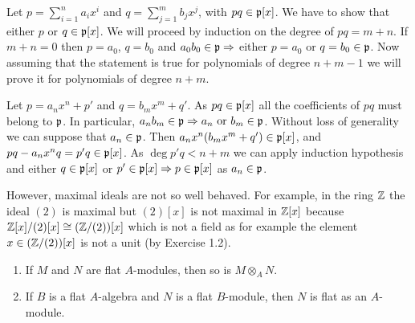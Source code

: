 \begin{sol}
	Let $p = \sum_{i = 1}^n a_i x^i$ and $q = \sum_{j = 1}^m b_j x^j$, with $pq \in \mathfrak{p}[x]$. We have to show that either $p$ or $q \in \mathfrak{p}[x]$. We will proceed by induction on the degree of $pq = m+n$. If $m+n = 0$ then $p = a_0$, $q = b_0$ and $a_0 b_0 \in \mathfrak{p} \Rightarrow$ either $p = a_0$ or $q = b_0 \in \mathfrak{p}$. Now assuming that the statement is true for polynomials of degree $n+m-1$ we will prove it for polynomials of degree $n+m$.

	Let $p = a_nx^n + p'$ and $q = b_m x^m + q'$. As $pq \in \mathfrak{p}[x]$ all the coefficients of $pq$ must belong to $\mathfrak{p}$. In particular, $a_n b_m \in \mathfrak{p} \Rightarrow a_n \text{ or } b_m \in \mathfrak{p}$. Without loss of generality we can suppose that $a_n \in \mathfrak{p}$. Then $a_n x^n (b_m x^m + q') \in \mathfrak{p}[x]$, and $pq - a_n x^n q = p'q \in \mathfrak{p}[x]$. As $\deg{p'q} < n+m$ we can apply induction hypothesis and either $q \in \mathfrak{p}[x]$ or $p' \in \mathfrak{p}[x] \Rightarrow p \in \mathfrak{p}[x]$ as $a_n \in \mathfrak{p}$.

	However, maximal ideals are not so well behaved. For example, in the ring $\mathbb{Z}$ the ideal $(2)$ is maximal but $(2)[x]$ is not maximal in $\mathbb{Z} [x]$ because $\mathbb{Z}[x] / (2)[x] \cong (\mathbb{Z}/(2)) [x]$ which is not a field as for example the element $x \in (\mathbb{Z}/(2)) [x]$ is not a unit (by Exercise 1.2).
\end{sol}

\begin{ex}
	\begin{enumerate}[label=(\roman*)]
		\item If $M$ and $N$ are flat $A$-modules, then so is $M \otimes_A N$.
		\item If $B$ is a flat $A$-algebra and $N$ is a flat $B$-module, then $N$ is flat as an $A$-module.
	\end{enumerate}
\end{ex}

